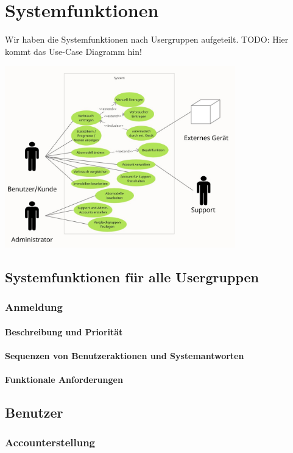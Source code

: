 \section{Systemfunktionen}
Wir haben die Systemfunktionen nach Usergruppen aufgeteilt. TODO: Hier kommt das Use-Case Diagramm hin!


\includegraphics[width=10cm]{system_features/UC.jpg}

\subsection{Systemfunktionen für alle Usergruppen}
\subsubsection{Anmeldung}
\paragraph{Beschreibung und Priorität}
\paragraph{Sequenzen von Benutzeraktionen und Systemantworten}
\paragraph{Funktionale Anforderungen}

\subsection{Benutzer}
\subsubsection{Accounterstellung}
